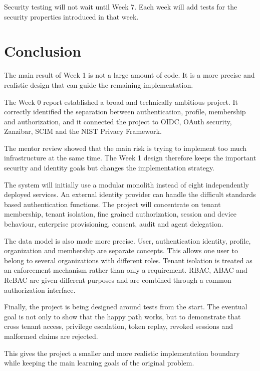\documentclass[11pt,a4paper]{article}
\begin{document}
Security testing will not wait until Week 7. Each week will add tests for the security properties introduced in that week.

\section{Conclusion}

The main result of Week 1 is not a large amount of code. It is a more precise and realistic design that can guide the remaining implementation.

The Week 0 report established a broad and technically ambitious project. It correctly identified the separation between authentication, profile, membership and authorization, and it connected the project to OIDC, OAuth security, Zanzibar, SCIM and the NIST Privacy Framework.

The mentor review showed that the main risk is trying to implement too much infrastructure at the same time. The Week 1 design therefore keeps the important security and identity goals but changes the implementation strategy.

The system will initially use a modular monolith instead of eight independently deployed services. An external identity provider can handle the difficult standards based authentication functions. The project will concentrate on tenant membership, tenant isolation, fine grained authorization, session and device behaviour, enterprise provisioning, consent, audit and agent delegation.

The data model is also made more precise. User, authentication identity, profile, organization and membership are separate concepts. This allows one user to belong to several organizations with different roles. Tenant isolation is treated as an enforcement mechanism rather than only a requirement. RBAC, ABAC and ReBAC are given different purposes and are combined through a common authorization interface.

Finally, the project is being designed around tests from the start. The eventual goal is not only to show that the happy path works, but to demonstrate that cross tenant access, privilege escalation, token replay, revoked sessions and malformed claims are rejected.

This gives the project a smaller and more realistic implementation boundary while keeping the main learning goals of the original problem.
\end{document}
